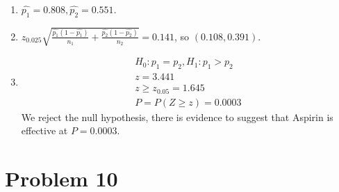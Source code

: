 \documentclass{article}
\begin{document}
\begin{enumerate}
	\item $\widehat{p_1} = 0.808, \widehat{p_2} = 0.551$.
	\item $z_{0.025} \sqrt{\frac{\widehat{p_1}(1-\widehat{p_1})}{n_1} + \frac{\widehat{p_2}(1-\widehat{p_2})}{n_2}} = 0.141$, so $(0.108, 0.391)$.
	\item
		\begin{gather*}
			H_0: p_1 = p_2, H_1: p_1 > p_2 \\
			z = 3.441 \\
			z \ge z_{0.05} = 1.645 \\
			P = P(Z \ge z) = 0.0003
		\end{gather*}
		We reject the null hypothesis, there is evidence to suggest that Aspirin is effective at $P = 0.0003$.
\end{enumerate}

\section*{Problem 10}
\end{document}
